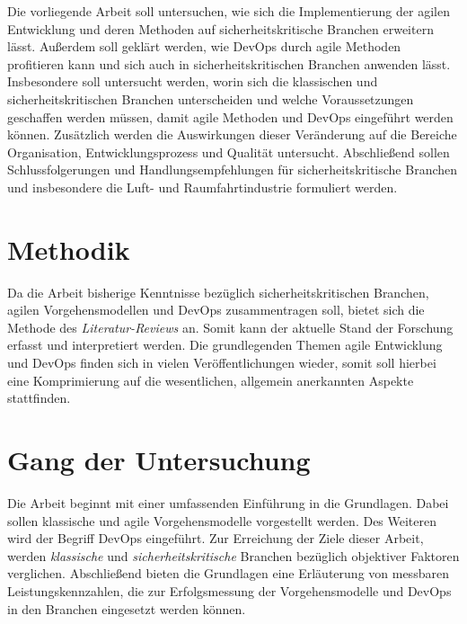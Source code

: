 Die vorliegende Arbeit soll untersuchen, wie sich die Implementierung der agilen Entwicklung und deren Methoden auf sicherheitskritische Branchen erweitern lässt.
Außerdem soll geklärt werden, wie DevOps durch agile Methoden profitieren kann und sich auch in sicherheitskritischen Branchen anwenden lässt.
Insbesondere soll untersucht werden, worin sich die klassischen und sicherheitskritischen Branchen unterscheiden und welche Voraussetzungen geschaffen werden müssen, damit agile Methoden und DevOps eingeführt werden können.
Zusätzlich werden die Auswirkungen dieser Veränderung auf die Bereiche Organisation, Entwicklungsprozess und Qualität untersucht.
Abschließend sollen Schlussfolgerungen und Handlungsempfehlungen für sicherheitskritische Branchen und insbesondere die Luft- und Raumfahrtindustrie formuliert werden.


\section{Methodik}

Da die Arbeit bisherige Kenntnisse bezüglich sicherheitskritischen Branchen, agilen Vorgehensmodellen und DevOps zusammentragen soll, bietet sich die Methode des \emph{Literatur-Reviews} \parencite[vgl.][]{Fettke:2006aa} an.
Somit kann der aktuelle Stand der Forschung erfasst und interpretiert werden.
Die grundlegenden Themen agile Entwicklung und DevOps finden sich in vielen Veröffentlichungen wieder, somit soll hierbei eine Komprimierung auf die wesentlichen, allgemein anerkannten Aspekte stattfinden.

\section{Gang der Untersuchung}

Die Arbeit beginnt mit einer umfassenden Einführung in die Grundlagen.
Dabei sollen klassische und agile Vorgehensmodelle vorgestellt werden.
Des Weiteren wird der Begriff DevOps eingeführt.
Zur Erreichung der Ziele dieser Arbeit, werden \emph{klassische} und \emph{sicherheitskritische} Branchen bezüglich objektiver Faktoren verglichen.
Abschließend bieten die Grundlagen eine Erläuterung von messbaren Leistungskennzahlen, die zur Erfolgsmessung der Vorgehensmodelle und DevOps in den Branchen eingesetzt werden können.

